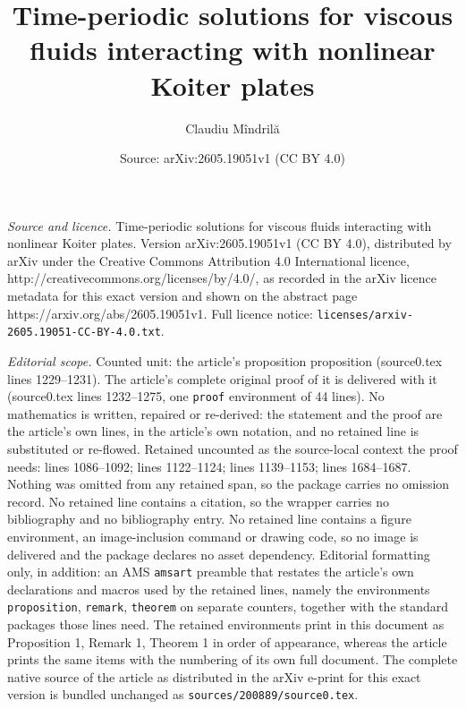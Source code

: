\documentclass[10pt,a4paper]{amsart}
\title{Time-periodic solutions for viscous fluids interacting with nonlinear Koiter plates}
\author{Claudiu M\^indril\u{a}}
\date{Source: arXiv:2605.19051v1 (CC BY 4.0)}
\begin{document}
\maketitle

\noindent\emph{Source and licence.} Time-periodic solutions for viscous fluids interacting with nonlinear Koiter plates. Version arXiv:2605.19051v1 (CC BY 4.0), distributed by arXiv under the Creative Commons Attribution 4.0 International licence, http://creativecommons.org/licenses/by/4.0/, as recorded in the arXiv licence metadata for this exact version and shown on the abstract page https://arxiv.org/abs/2605.19051v1. Full licence notice: \texttt{licenses/arxiv-2605.19051-CC-BY-4.0.txt}.\par\smallskip

\noindent\textit{Editorial scope.} Counted unit: the article's proposition proposition (source0.tex lines 1229--1231). The article's complete original proof of it is delivered with it (source0.tex lines 1232--1275, one \texttt{proof} environment of 44 lines). No mathematics is written, repaired or re-derived: the statement and the proof are the article's own lines, in the article's own notation, and no retained line is substituted or re-flowed.  Retained uncounted as the source-local context the proof needs: lines 1086--1092; lines 1122--1124; lines 1139--1153; lines 1684--1687.  Nothing was omitted from any retained span, so the package carries no omission record.  No retained line contains a citation, so the wrapper carries no bibliography and no bibliography entry.  No retained line contains a figure environment, an image-inclusion command or drawing code, so no image is delivered and the package declares no asset dependency.  Editorial formatting only, in addition: an AMS \texttt{amsart} preamble that restates the article's own declarations and macros used by the retained lines, namely the environments \texttt{proposition}, \texttt{remark}, \texttt{theorem} on separate counters, together with the standard packages those lines need.  The retained environments print in this document as Proposition 1, Remark 1, Theorem 1 in order of appearance, whereas the article prints the same items with the numbering of its own full document.  The complete native source of the article as distributed in the arXiv e-print for this exact version is bundled unchanged as \texttt{sources/200889/source0.tex}.
\end{document}
